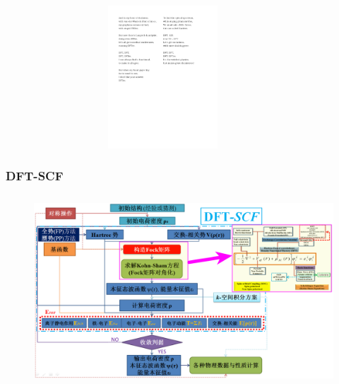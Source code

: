 \frame
{
	\frametitle{}
\begin{figure}[h!]
	\vspace{-10pt}
\centering
\includegraphics[height=2.10in,width=3.8in,viewport=0 350 550 650,clip]{Figures/DFT_song-2.pdf}
\label{DFT_Song_03}
\end{figure}
}
\frame
{
	\frametitle{\textrm{DFT-SCF}}
\begin{figure}[h!]
\centering
\vspace*{-0.25in}
\hspace*{-0.80in}
\includegraphics[height=2.80in,width=4.95in,viewport=5 3 1490 870,clip]{Figures/DFT-SCF_2.png}
\label{DFT-SCF-2}
\end{figure}
}


